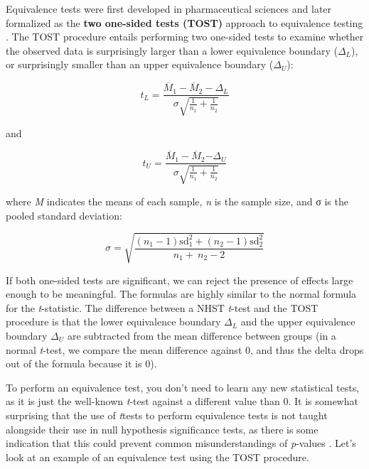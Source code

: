 \documentclass[
  oneside]{book}
\begin{document}
Equivalence tests were first developed in pharmaceutical sciences \citep{hauck_new_1984, westlake_use_1972} and later formalized as the \textbf{two one-sided tests (TOST)} approach to equivalence testing \citep{schuirmann_comparison_1987, seaman_equivalence_1998, wellek_testing_2010}. The TOST procedure entails performing two one-sided tests to examine whether the observed data is surprisingly larger than a lower equivalence boundary (\(\Delta_{L}\)), or surprisingly smaller than an upper equivalence boundary (\(\Delta_{U}\)):

\[
t_{L} = \frac{{\overline{M}}_{1} - {\overline{M}}_{2} - \Delta_{L}}{\sigma\sqrt{\frac{1}{n_{1}} + \frac{1}{n_{2}}}}
\]

and

\[
t_{U} = \frac{{\overline{M}}_{1} - {\overline{M}}_{2}{- \Delta}_{U}}{\sigma\sqrt{\frac{1}{n_{1}} + \frac{1}{n_{2}}}}
\]

where \emph{M} indicates the means of each sample, \emph{n} is the sample size, and σ is
the pooled standard deviation:

\[
\sigma = \sqrt{\frac{\left( n_{1} - 1 \right)\text{sd}_{1}^{2} + \left( n_{2} - 1 \right)\text{sd}_{2}^{2}}{n_{1} + \ n_{2} - 2}}
\]

If both one-sided tests are significant, we can reject the presence of effects large enough to be meaningful. The formulas are highly similar to the normal formula for the \emph{t}-statistic. The difference between a NHST \emph{t}-test and the TOST procedure is that the lower equivalence boundary \(\Delta_{L}\) and the upper equivalence boundary \(\Delta_{U}\) are subtracted from the mean difference between groups (in a normal \emph{t}-test, we compare the mean difference against 0, and thus the delta drops out of the formula because it is 0).

To perform an equivalence test, you don't need to learn any new statistical tests, as it is just the well-known \emph{t}-test against a different value than 0. It is somewhat surprising that the use of \emph{t}tests to perform equivalence tests is not taught alongside their use in null hypothesis significance tests, as there is some indication that this could prevent common misunderstandings of \emph{p}-values \citep{parkhurst_statistical_2001}. Let's look at an example of an equivalence test using the TOST procedure.
\end{document}
